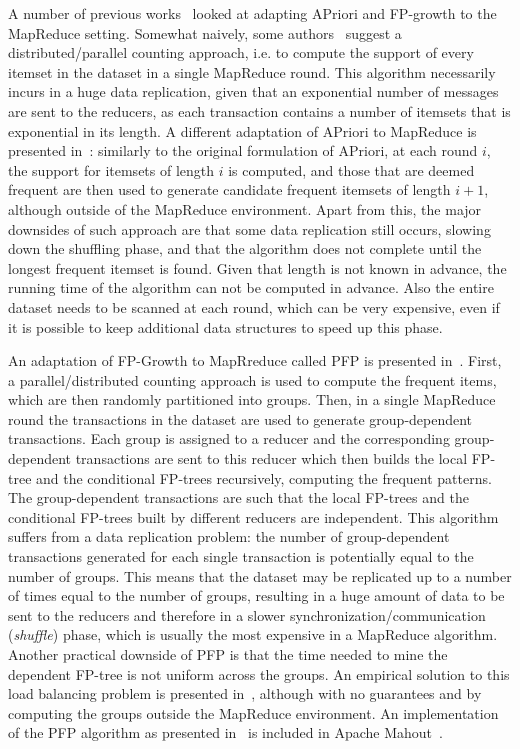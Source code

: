 A number of previous
works~\cite{CryansRC10,GhotingKPK11,Hammoud11,LiWZZC08,LiZ11,YangLF10,ZhouZCLF10}
looked at adapting APriori and FP-growth to the MapReduce setting. Somewhat
naively, some authors~\cite{CryansRC10,LiZ11,YangLF10} suggest a distributed/parallel
counting approach, i.e. to compute the support of every itemset in the dataset
in a single MapReduce round. This algorithm necessarily incurs in a huge data
replication, given that an exponential number of messages are sent to the
reducers, as each transaction contains a number of itemsets that is exponential
in its length. A different adaptation of APriori to MapReduce is presented
in~\cite[Chap.4]{Hammoud11}: similarly to the original formulation of APriori,
at each round $i$, the support for itemsets of length $i$ is computed, and those
that are deemed frequent are then used to generate candidate frequent itemsets
of length $i+1$, although outside of the MapReduce environment. Apart from this,
the major downsides of such approach are that some data replication still
occurs, slowing down the shuffling phase, and that the algorithm does not
complete until the longest frequent itemset is found. Given that length is not
known in advance, the running time of the algorithm can not be
computed in advance. Also the entire dataset needs to be scanned at each round, which
can be very expensive, even if it is possible to keep additional data structures
to speed up this phase.  

An adaptation of FP-Growth to MapRreduce called PFP is presented in~\cite{LiWZZC08}. First,
a parallel/distributed counting approach is used to compute the frequent items,
which are then randomly partitioned into groups. Then, in a single MapReduce
round the transactions in the dataset are used to generate group-dependent
transactions. Each group is assigned to a reducer and the corresponding
group-dependent transactions are sent to this reducer which then builds the
local FP-tree and the conditional FP-trees recursively, computing the frequent
patterns. The group-dependent transactions are such that the local FP-trees and
the conditional FP-trees built by different reducers are independent. This
algorithm suffers from a data replication problem: the number of
group-dependent transactions generated for each single transaction is
potentially equal to the number of groups. This means that the dataset may be
replicated up to a number of times equal to the number of groups, resulting in a
huge amount of data to be sent to the reducers and therefore in a slower
synchronization/communication (\emph{shuffle}) phase, which is usually the most
expensive in a MapReduce algorithm.  Another practical downside of PFP is that
the time needed to mine the dependent FP-tree is not uniform across the groups.
An empirical solution to this load balancing problem is presented
in~\cite{ZhouZCLF10}, although with no guarantees and by computing the groups
outside the MapReduce environment. An implementation of the PFP algorithm as
presented in~\cite{LiWZZC08} is included in Apache
Mahout~\cite{Mahout}.

